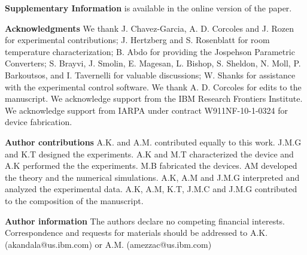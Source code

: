 \documentclass[twocolumn]{revtex4-1}
\newcommand{\1}{\mathbbm{1}}
\begin{document}
{\bf Supplementary Information} is available in the online version of the paper.

{\bf Acknowledgments}
We thank J. Chavez-Garcia, A. D. Corcoles and J. Rozen for experimental contributions; J. Hertzberg and S. Rosenblatt for room temperature characterization; B. Abdo for providing the Jospehson Parametric Converters;  S. Brayvi, J. Smolin, E. Magesan, L. Bishop, S. Sheldon, N. Moll, P. Barkoutsos, and I. Tavernelli for valuable discussions; W. Shanks for assistance with the experimental control software. We thank A. D. Corcoles for edits to the manuscript. We acknowledge support from the IBM Research Frontiers Institute. We  acknowledge  support  from  IARPA  under  contract  W911NF-10-1-0324 for device fabrication.

{\bf Author contributions}
A.K. and A.M. contributed equally to this work. J.M.G and K.T designed the experiments. A.K and M.T characterized the device and A.K performed the the experiments. M.B fabricated the devices. AM developed the theory and the numerical simulations. A.K, A.M and J.M.G interpreted and analyzed the experimental data. A.K, A.M, K.T, J.M.C and J.M.G contributed to the composition of the manuscript. 

{\bf Author information} The authors declare no competing financial interests. Correspondence and requests for materials should be addressed to A.K. (akandala@us.ibm.com) or A.M. (amezzac@us.ibm.com)
\end{document}
